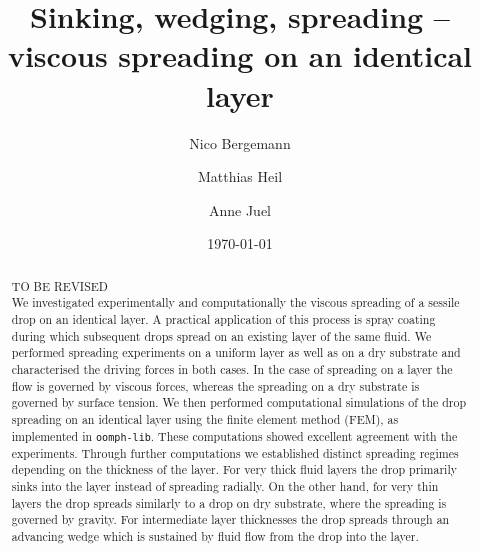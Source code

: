 \documentclass[aip,graphicx]{revtex4-1}
\begin{document}

\title{Sinking, wedging, spreading -- viscous spreading on an identical layer}



\author{Nico Bergemann}
\author{Matthias Heil}
\author{Anne Juel}


\date{\today}

\begin{abstract}
TO BE REVISED\\
 We investigated experimentally and computationally the viscous spreading of a sessile drop on an identical layer.
 A practical application of this process is spray coating during which subsequent drops spread on an existing layer of the same fluid.
 We performed spreading experiments on a uniform layer as well as on a dry substrate and characterised the driving forces in both cases.
 In the case of spreading on a layer the flow is governed by viscous forces, whereas the spreading on a dry substrate is governed by surface tension.
 We then performed computational simulations of the drop spreading on an identical layer using the finite element method (FEM), as implemented in \texttt{oomph-lib}.
 These computations showed excellent agreement with the experiments.
 Through further computations we established distinct spreading regimes depending on the thickness of the layer.
 For very thick fluid layers the drop primarily sinks into the layer instead of spreading radially.
 On the other hand, for very thin layers the drop spreads similarly to a drop on dry substrate, where the spreading is governed by gravity.
 For intermediate layer thicknesses the drop spreads through an advancing wedge which is sustained by fluid flow from the drop into the layer.
\end{abstract}
\end{document}
